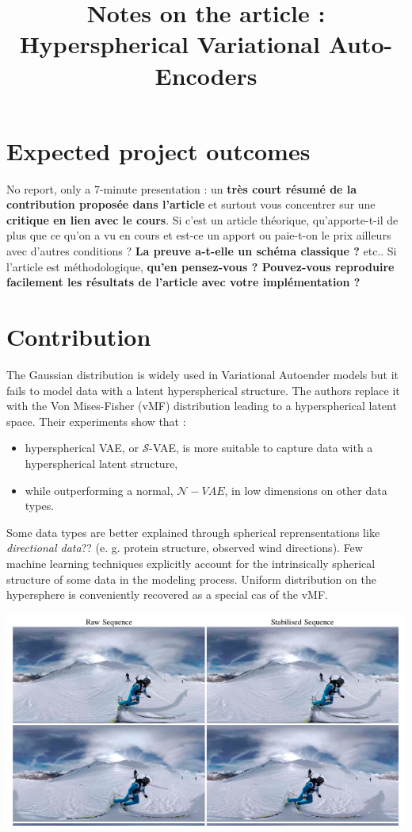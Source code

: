 \documentclass[12pt]{article}
\title{Notes on the article : Hyperspherical Variational Auto-Encoders}
\author{}
\begin{document}
\maketitle

\section{Expected project outcomes}
No report, only a 7-minute presentation :
un \textbf{très court résumé de la contribution proposée dans l'article} et surtout vous concentrer sur une \textbf{critique en lien avec le cours}.
Si c'est un article théorique, qu'apporte-t-il de plus que ce qu'on a vu en cours et est-ce un apport ou paie-t-on le prix ailleurs avec d'autres conditions ? \textbf{La preuve a-t-elle un schéma classique ?} etc..
Si l'article est méthodologique, \textbf{qu'en pensez-vous ? Pouvez-vous reproduire facilement les résultats de l'article avec votre implémentation ?}

\section{Contribution}
The Gaussian distribution is widely used in Variational Autoender models but it fails to model data with a latent hyperspherical structure. The authors replace it with the Von Mises-Fisher (vMF) distribution leading to a hyperspherical latent space.
Their experiments show that :
\begin{itemize}
    \item hyperspherical VAE, or $\mathcal{S}$-VAE, is more suitable to capture data with a hyperspherical latent structure,
    \item while outperforming a normal, $\mathcal{N}-VAE$, in low dimensions on other data types.
\end{itemize}

Some data types are better explained through spherical reprensentations like \textit{directional data}?? (e. g. protein structure, observed wind directions). Few machine learning techniques explicitly account for the intrinsically spherical structure of some data in the modeling process.
Uniform distribution on the hypersphere is conveniently recovered as a special cas of the vMF.

\includegraphics[width=\textwidth]{figures/spherical_video.png}
\end{document}
